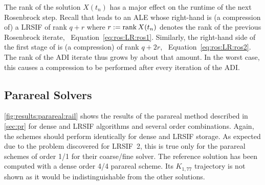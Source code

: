 The rank of the solution $X(t_n)$ has a major effect on the runtime of the next Rosenbrock step.
Recall that  leads to an \ac{ALE} whose right-hand is (a compression of) a \ac{LRSIF} of rank $q+r$
where $r := \operatorname{rank} X(t_n)$ denotes the rank of the previous Rosenbrock iterate,
\cf~Equation~\eqref{eq:ros:LR:ros1}.
Similarly, the right-hand side of the first stage of  is (a compression) of rank $q + 2r$,
\cf~Equation~\eqref{eq:ros:LR:ros2}.
The rank of the \ac{ADI} iterate thus grows by about that amount.
In the worst case, this causes a compression to be performed after every iteration of the \ac{ADI}.

\pagebreak

\subsection{Parareal Solvers}
\label{sec:results:parareal}

\autoref{fig:results:parareal:rail} shows the results of the parareal method described in \autoref{sec:pr}
for dense and \ac{LRSIF} algorithms and several order combinations.
Again, the schemes should perform identically for dense and \ac{LRSIF} storage.
As expected due to the problem discovered for \ac{LRSIF}~2,
this is true only for the parareal schemes of order 1/1 for their coarse/fine solver.
The reference solution has been computed with a dense order 4/4 parareal scheme.
Its $K_{1,77}$ trajectory is not shown as it would be indistinguishable from the other solutions.

